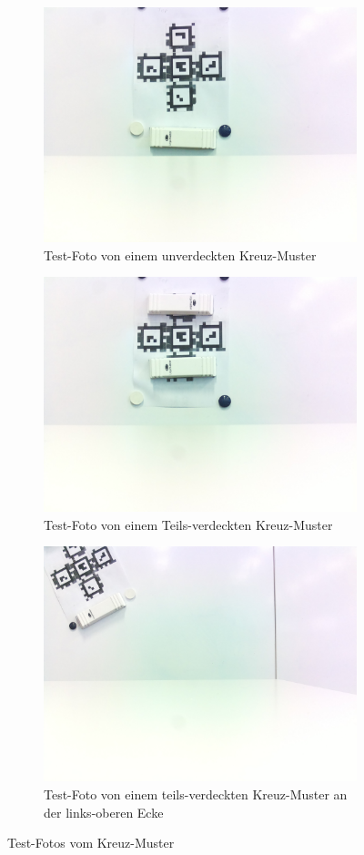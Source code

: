 \begin{figure}[H]
    \centering
    \begin{subfigure}[h]{0.5\textwidth}
        \includegraphics[width=0.5\linewidth]{graphics/MittelpunktTestFoto.jpg}
        \caption{Test-Foto von einem unverdeckten Kreuz-Muster}
        \label{fig:MittelpunktTest}
    \end{subfigure}
    \begin{subfigure}[h]{0.5\textwidth}
        \includegraphics[width=0.5\linewidth]{graphics/ocluded2Test.jpg}
        \caption{Test-Foto von einem Teils-verdeckten Kreuz-Muster}
        \label{fig:Mittelpunktocluded}
    \end{subfigure}
    \begin{subfigure}[h]{0.5\textwidth}
        \includegraphics[width=0.5\linewidth]{graphics/edgeExtreme.jpg}
        \caption{Test-Foto von einem teils-verdeckten Kreuz-Muster an der links-oberen Ecke}
        \label{fig:MittelpunktExtreme}
    \end{subfigure}
    
    \caption{Test-Fotos vom Kreuz-Muster}
\label{fig:TestFotosMittelpunkt}
\end{figure}

